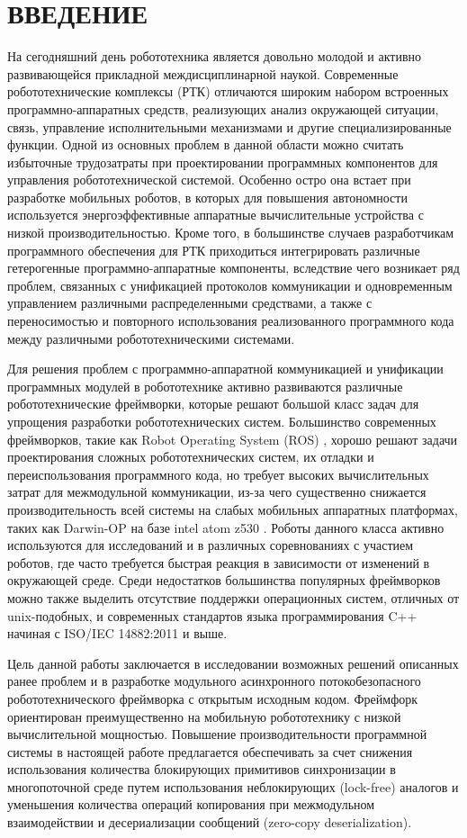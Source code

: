 \chapter*{ВВЕДЕНИЕ}

На сегодняшний день робототехника является довольно молодой и активно 
развивающейся прикладной междисциплинарной наукой. Современные 
робототехнические комплексы (РТК) отличаются широким набором встроенных 
программно-аппаратных средств, реализующих анализ окружающей ситуации, связь, 
управление исполнительными механизмами и другие специализированные функции. 
Одной из основных проблем в данной области можно считать избыточные трудозатраты при проектировании программных компонентов для управления робототехнической системой. Особенно остро она встает при разработке мобильных роботов, в которых для повышения автономности используется энергоэффективные аппаратные вычислительные устройства с низкой производительностью. Кроме того, в большинстве случаев разработчикам программного обеспечения для РТК приходиться интегрировать различные гетерогенные программно-аппаратные компоненты, вследствие чего возникает ряд проблем, связанных с унификацией протоколов коммуникации и одновременным управлением различными распределенными средствами, а также с переносимостью и повторного использования реализованного программного кода между различными робототехническими системами.

Для решения проблем с программно-аппаратной коммуникацией и унификации 
программных модулей в робототехнике активно развиваются различные 
робототехнические фреймворки, которые решают большой класс задач для упрощения разработки робототехнических систем. Большинство современных фреймворков, такие как Robot Operating System (ROS) \cite{quigley2009ros}, хорошо решают задачи проектирования сложных робототехнических систем, их отладки и переиспользования программного кода, но требует высоких вычислительных затрат для межмодульной коммуникации, из-за чего существенно снижается производительность всей системы на слабых мобильных аппаратных платформах, таких как Darwin-OP на базе intel atom z530 \cite{ha2011development}. Роботы данного класса активно используются для исследований и в различных соревнованиях с участием роботов, где часто требуется быстрая реакция в зависимости от изменений в окружающей среде. Среди недостатков большинства популярных фреймворков можно также выделить отсутствие поддержки операционных систем, отличных от unix-подобных, и современных стандартов языка программирования C++ начиная с ISO/IEC 14882:2011 \cite{c++2011iso} и выше.

Цель данной работы заключается в исследовании возможных решений описанных ранее проблем и в разработке модульного асинхронного потокобезопасного робототехнического фреймворка с открытым исходным кодом. Фреймфорк ориентирован преимущественно на мобильную робототехнику с низкой вычислительной мощностью. Повышение производительности программной системы в настоящей работе предлагается обеспечивать за счет снижения использования количества блокирующих примитивов синхронизации в многопоточной среде путем использования неблокирующих (lock-free) аналогов и уменьшения количества операций копирования при межмодульном взаимодействии и десериализации сообщений (zero-copy deserialization).
